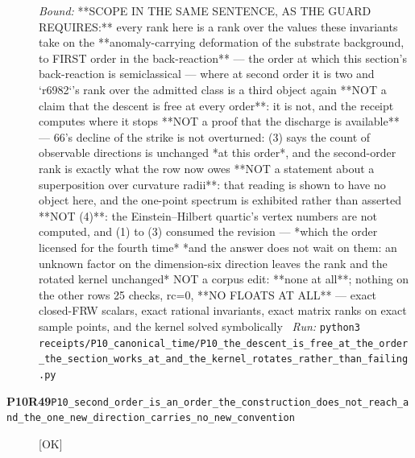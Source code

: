 \begin{description}
 \emph{Bound:}  **SCOPE IN THE SAME SENTENCE, AS THE GUARD REQUIRES:** every rank here is a rank over the values these invariants take on the **anomaly-carrying deformation of the substrate background, to FIRST order in the back-reaction** --- the order at which this section's back-reaction is semiclassical --- where at second order it is two and `r6982`'s rank over the admitted class is a third object again  **NOT a claim that the descent is free at every order**: it is not, and the receipt computes where it stops  **NOT a proof that the discharge is available** --- 66's decline of the strike is not overturned: (3) says the count of observable directions is unchanged *at this order*, and the second-order rank is exactly what the row now owes  **NOT a statement about a superposition over curvature radii**: that reading is shown to have no object here, and the one-point spectrum is exhibited rather than asserted  **NOT (4)**: the Einstein--Hilbert quartic's vertex numbers are not computed, and (1) to (3) consumed the revision --- *which the order licensed for the fourth time*  *and the answer does not wait on them: an unknown factor on the dimension-six direction leaves the rank and the rotated kernel unchanged*  NOT a corpus edit: **none at all**; nothing on the other rows  25 checks, rc=0, **NO FLOATS AT ALL** --- exact closed-FRW scalars, exact rational invariants, exact matrix ranks on exact sample points, and the kernel solved symbolically
\ \emph{Run:} \texttt{python3 receipts/P10\_canonical\_time/P10\_the\_descent\_is\_free\_at\_the\_order\_the\_section\_works\_at\_and\_the\_kernel\_rotates\_rather\_than\_failing.py}
\item[\rcptlabel{P10_second_order_is_an_order_the_construction_does_not_reach_and_the_one_new_direction_carries_no_new_convention}{P10R49}\textbf{P10R49}\quad\texttt{P10\_second\_order\_is\_an\_order\_the\_construction\_does\_not\_reach\_and\_the\_one\_new\_direction\_carries\_no\_new\_convention}]\hfill\textsf{[OK]}\\

\end{description}
